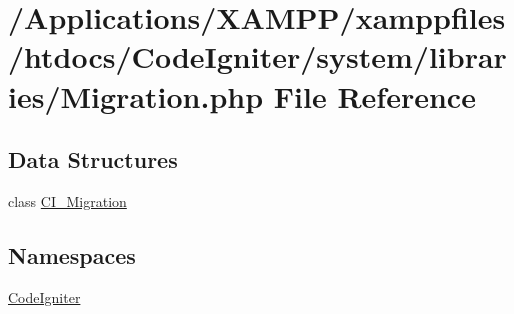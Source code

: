 \hypertarget{system_2libraries_2migration_8php}{}\section{/\+Applications/\+X\+A\+M\+P\+P/xamppfiles/htdocs/\+Code\+Igniter/system/libraries/\+Migration.php File Reference}
\label{system_2libraries_2migration_8php}
\subsection*{Data Structures}
\begin{DoxyCompactItemize}
\item 
class \mbox{\hyperlink{class_c_i___migration}{C\+I\+\_\+\+Migration}}
\end{DoxyCompactItemize}
\subsection*{Namespaces}
\begin{DoxyCompactItemize}
\item 
 \mbox{\hyperlink{namespace_code_igniter}{Code\+Igniter}}
\end{DoxyCompactItemize}
